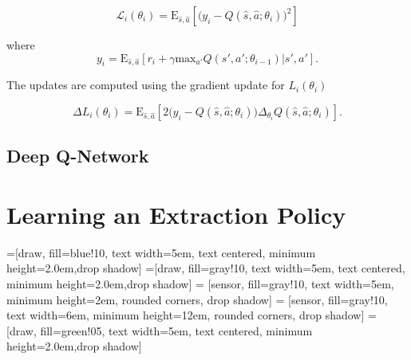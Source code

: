 \documentclass[12pt]{article}
\begin{document}
\begin{equation}
	\mathcal{L}_i(\theta_i) =  \textrm{E}_{\hat{s}, \hat{a}}[ \big (y_i - Q(\hat{s}, \hat{a}; \theta_i) \big )^2]
\end{equation}

where 
\begin{equation}
	y_i = \textrm{E}_{\hat{s}, \hat{a}}[ r_i + \gamma \textrm{max}_{a'} Q(s', a' ; \theta_{i-1}) | s', a' ].
\end{equation}

The updates are computed using the gradient update for $L_i(\theta_i)$

\begin{equation}
	\Delta L_i(\theta_i) = \textrm{E}_{\hat{s}, \hat{a}}[ 2  \big (y_i - Q(\hat{s}, \hat{a}; \theta_i) \big ) \Delta_{\theta_{i}}  Q(\hat{s}, \hat{a}; \theta_i)].
\end{equation}

\subsection{Deep Q-Network}
\section{Learning an Extraction Policy}

\center
    =[draw, fill=blue!10, text width=5em,  text centered, minimum height=2.0em,drop shadow]
    =[draw, fill=gray!10, text width=5em,  text centered, minimum height=2.0em,drop shadow]
     = [sensor, fill=gray!10, text width=5em,  minimum height=2em, rounded corners, drop shadow]
     = [sensor, fill=gray!10, text width=6em,  minimum height=12em, rounded corners, drop shadow]
     = [draw, fill=green!05, text width=5em,  text centered, minimum height=2.0em,drop shadow]
\end{document}
